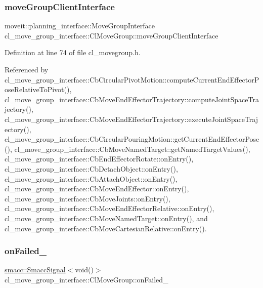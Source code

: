 \subsubsection{\texorpdfstring{move\+Group\+Client\+Interface}{moveGroupClientInterface}}
{\footnotesize\ttfamily moveit\+::planning\+\_\+interface\+::\+Move\+Group\+Interface cl\+\_\+move\+\_\+group\+\_\+interface\+::\+Cl\+Move\+Group\+::move\+Group\+Client\+Interface}



Definition at line 74 of file cl\+\_\+movegroup.\+h.



Referenced by cl\+\_\+move\+\_\+group\+\_\+interface\+::\+Cb\+Circular\+Pivot\+Motion\+::compute\+Current\+End\+Effector\+Pose\+Relative\+To\+Pivot(), cl\+\_\+move\+\_\+group\+\_\+interface\+::\+Cb\+Move\+End\+Effector\+Trajectory\+::compute\+Joint\+Space\+Trajectory(), cl\+\_\+move\+\_\+group\+\_\+interface\+::\+Cb\+Move\+End\+Effector\+Trajectory\+::execute\+Joint\+Space\+Trajectory(), cl\+\_\+move\+\_\+group\+\_\+interface\+::\+Cb\+Circular\+Pouring\+Motion\+::get\+Current\+End\+Effector\+Pose(), cl\+\_\+move\+\_\+group\+\_\+interface\+::\+Cb\+Move\+Named\+Target\+::get\+Named\+Target\+Values(), cl\+\_\+move\+\_\+group\+\_\+interface\+::\+Cb\+End\+Effector\+Rotate\+::on\+Entry(), cl\+\_\+move\+\_\+group\+\_\+interface\+::\+Cb\+Detach\+Object\+::on\+Entry(), cl\+\_\+move\+\_\+group\+\_\+interface\+::\+Cb\+Attach\+Object\+::on\+Entry(), cl\+\_\+move\+\_\+group\+\_\+interface\+::\+Cb\+Move\+End\+Effector\+::on\+Entry(), cl\+\_\+move\+\_\+group\+\_\+interface\+::\+Cb\+Move\+Joints\+::on\+Entry(), cl\+\_\+move\+\_\+group\+\_\+interface\+::\+Cb\+Move\+End\+Effector\+Relative\+::on\+Entry(), cl\+\_\+move\+\_\+group\+\_\+interface\+::\+Cb\+Move\+Named\+Target\+::on\+Entry(), and cl\+\_\+move\+\_\+group\+\_\+interface\+::\+Cb\+Move\+Cartesian\+Relative\+::on\+Entry().

\mbox{\label{classcl__move__group__interface_1_1ClMoveGroup_a3e0ea6acf70a0c527864b712b215033b}} 
\subsubsection{\texorpdfstring{on\+Failed\+\_\+}{onFailed\_}}
{\footnotesize\ttfamily \hyperlink{classsmacc_1_1SmaccSignal}{smacc\+::\+Smacc\+Signal}$<$void()$>$ cl\+\_\+move\+\_\+group\+\_\+interface\+::\+Cl\+Move\+Group\+::on\+Failed\+\_\+\hspace{0.3cm}{\ttfamily [private]}}



